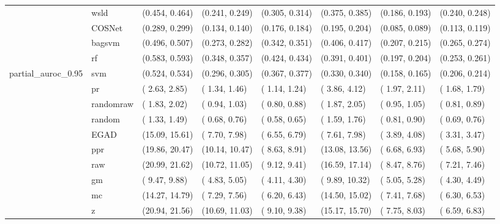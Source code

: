 \begin{table}[H]
{\begin{tabular}{llllllll}
 & wsld & (0.454, 0.464) & (0.241, 0.249) & (0.305, 0.314) & (0.375, 0.385) & (0.186, 0.193) & (0.240, 0.248)\\

 & COSNet & (0.289, 0.299) & (0.134, 0.140) & (0.176, 0.184) & (0.195, 0.204) & (0.085, 0.089) & (0.113, 0.119)\\

 & bagsvm & (0.496, 0.507) & (0.273, 0.282) & (0.342, 0.351) & (0.406, 0.417) & (0.207, 0.215) & (0.265, 0.274)\\

 & rf & (0.583, 0.593) & (0.348, 0.357) & (0.424, 0.434) & (0.391, 0.401) & (0.197, 0.204) & (0.253, 0.261)\\

\multirow{-15}{*}{\raggedright\arraybackslash partial\_auroc\_0.95} & svm & (0.524, 0.534) & (0.296, 0.305) & (0.367, 0.377) & (0.330, 0.340) & (0.158, 0.165) & (0.206, 0.214)\\
\cmidrule{1-8}
 & pr & ( 2.63,  2.85) & ( 1.34,  1.46) & ( 1.14,  1.24) & ( 3.86,  4.12) & ( 1.97,  2.11) & ( 1.68,  1.79)\\

 & randomraw & ( 1.83,  2.02) & ( 0.94,  1.03) & ( 0.80,  0.88) & ( 1.87,  2.05) & ( 0.95,  1.05) & ( 0.81,  0.89)\\

 & random & ( 1.33,  1.49) & ( 0.68,  0.76) & ( 0.58,  0.65) & ( 1.59,  1.76) & ( 0.81,  0.90) & ( 0.69,  0.76)\\

 & EGAD & (15.09, 15.61) & ( 7.70,  7.98) & ( 6.55,  6.79) & ( 7.61,  7.98) & ( 3.89,  4.08) & ( 3.31,  3.47)\\

 & ppr & (19.86, 20.47) & (10.14, 10.47) & ( 8.63,  8.91) & (13.08, 13.56) & ( 6.68,  6.93) & ( 5.68,  5.90)\\

 & raw & (20.99, 21.62) & (10.72, 11.05) & ( 9.12,  9.41) & (16.59, 17.14) & ( 8.47,  8.76) & ( 7.21,  7.46)\\

 & gm & ( 9.47,  9.88) & ( 4.83,  5.05) & ( 4.11,  4.30) & ( 9.89, 10.32) & ( 5.05,  5.28) & ( 4.30,  4.49)\\

 & mc & (14.27, 14.79) & ( 7.29,  7.56) & ( 6.20,  6.43) & (14.50, 15.02) & ( 7.41,  7.68) & ( 6.30,  6.53)\\

 & z & (20.94, 21.56) & (10.69, 11.03) & ( 9.10,  9.38) & (15.17, 15.70) & ( 7.75,  8.03) & ( 6.59,  6.83)\\


\end{tabular}}
\end{table}
